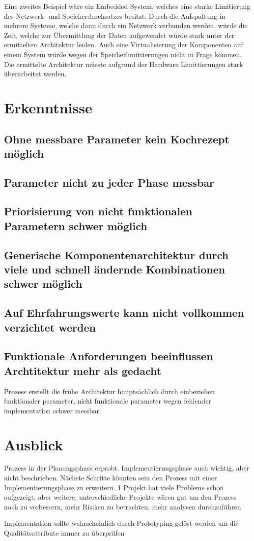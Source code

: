 Eine zweites Beispiel wäre ein Embedded System, welches eine starke Limitierung des Netzwerk- und Speicherdurchsatzes besitzt: Durch die Aufspaltung in mehrere Systeme, welche dann durch ein Netzwerk verbunden werden, würde die Zeit, welche zur Übermittlung der Daten aufgewendet würde stark unter der ermittelten Architektur leiden. Auch eine Virtualisierung der Komponenten auf einem System würde wegen der Speicherlimittierungen nicht in Frage kommen. Die ermittelte Architektur müsste aufgrund der Hardware Limittierungen stark überarbeitet werden.

\section{Erkenntnisse}
\subsection{Ohne messbare Parameter kein Kochrezept möglich}
\subsection{Parameter nicht zu jeder Phase messbar}
\subsection{Priorisierung von nicht funktionalen Parametern schwer möglich}
\subsection{Generische Komponentenarchitektur durch viele und schnell ändernde Kombinationen schwer möglich}
\subsection{Auf Ehrfahrungswerte kann nicht vollkommen verzichtet werden}
\subsection{Funktionale Anforderungen beeinflussen Archtitektur mehr als gedacht}
Prozess erstellt die frühe Architektur hauptsächlich durch einbeziehen funktionaler parameter, nicht funktionale parameter wegen fehlender implementation schwer messbar.

\section{Ausblick}
Prozess in der Planungsphase erprobt. Implementierungsphase auch wichtig, aber nicht beschrieben. Nächste Schritte könnten sein den Prozess mit einer Implementierungsphase zu erweitern. 1 Projekt hat viele Probleme schon aufgezeigt, aber weitere, unterschiedliche Projekte wären gut um den Prozess noch zu verbessern, mehr Risiken zu betrachten, mehr analysen durchzuführen

Implementation sollte wahrscheinlich durch Prototyping gelöst werden um die Qualitätsattribute immer zu überprüfen

